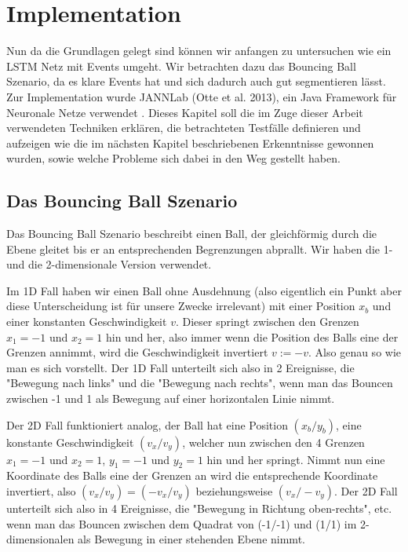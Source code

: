 \chapter{Implementation}
Nun da die Grundlagen gelegt sind können wir anfangen zu untersuchen wie ein LSTM Netz mit Events umgeht. Wir betrachten dazu das Bouncing Ball Szenario, da es klare Events hat und sich dadurch auch gut segmentieren lässt. Zur Implementation wurde JANNLab (Otte et al. 2013), ein Java Framework für Neuronale Netze verwendet \cite{bib:jannlab}. Dieses Kapitel soll die im Zuge dieser Arbeit verwendeten Techniken erklären, die betrachteten Testfälle definieren und aufzeigen wie die im nächsten Kapitel beschriebenen Erkenntnisse gewonnen wurden, sowie welche Probleme sich dabei in den Weg gestellt haben.

\section{Das Bouncing Ball Szenario}
Das Bouncing Ball Szenario beschreibt einen Ball, der gleichförmig durch die Ebene gleitet bis er an entsprechenden Begrenzungen abprallt. Wir haben die 1- und die 2-dimensionale Version verwendet.

Im 1D Fall haben wir einen Ball ohne Ausdehnung (also eigentlich ein Punkt aber diese Unterscheidung ist für unsere Zwecke irrelevant) mit einer Position $ x_{b} $ und einer konstanten Geschwindigkeit $  v$. Dieser springt zwischen den Grenzen $ x_{1}=-1 $ und $ x_{2}=1 $ hin und her, also immer wenn die Position des Balls eine der Grenzen annimmt, wird die Geschwindigkeit invertiert $ v := -v $. Also genau so wie man es sich vorstellt. Der 1D Fall unterteilt sich also in 2 Ereignisse, die "Bewegung nach links" und die "Bewegung nach rechts", wenn man das Bouncen zwischen -1 und 1 als Bewegung auf einer horizontalen Linie nimmt.

Der 2D Fall funktioniert analog, der Ball hat eine Position $ (x_{b}/y_{b}) $, eine konstante Geschwindigkeit $ (v_{x}/v_{y}) $, welcher nun zwischen den 4 Grenzen $ x_{1}=-1 $ und $ x_{2}=1 $, $ y_{1}=-1 $ und $ y_{2}=1 $ hin und her springt. Nimmt nun eine Koordinate des Balls eine der Grenzen an wird die entsprechende Koordinate invertiert, also $ (v_{x}/v_{y}) = (-v_{x}/v_{y}) $ beziehungsweise $ (v_{x}/-v_{y}) $. Der 2D Fall unterteilt sich also in 4 Ereignisse, die "Bewegung in Richtung oben-rechts", etc. wenn man das Bouncen zwischen dem Quadrat von (-1/-1) und (1/1) im 2-dimensionalen als Bewegung in einer stehenden Ebene nimmt.

